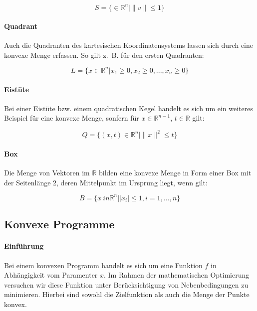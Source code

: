 \begin{equation*}
S = \{ \in \mathbb{R}^{n} | \|v\| \le 1\}
\end{equation*}

\paragraph{Quadrant}

Auch die Quadranten des kartesischen Koordinatensystems lassen sich durch eine konvexe Menge erfassen. So gilt z.~B. für den ersten Quadranten:

\begin{equation*}
L = \{ x \in \mathbb{R}^{n} | x_1 \ge 0, x_2 \ge 0, ..., x_n \ge 0\}
\end{equation*}

\paragraph{Eistüte}

Bei einer Eistüte bzw. einem quadratischen Kegel handelt es sich um ein weiteres Beispiel für eine konvexe Menge, sonfern für $x \in \mathbb{R}^{n-1}$, $t \in \mathbb{R}$ gilt:

\begin{equation*}
Q = \{(x, t) \in \mathbb{R}^{n} | \|x\|^{2} \le t\}
\end{equation*}

\paragraph{Box}

Die Menge von Vektoren im $\mathbb{R}$ bilden eine konvexe Menge in Form einer Box mit der Seitenlänge 2, deren Mittelpunkt im Ursprung liegt, wenn gilt:

\begin{equation*}
B = \{x \ in \mathbb{R}^{n} | |x_{i}| \le 1, i = 1, ..., n\}
\end{equation*}

\subsection{Konvexe Programme}

\paragraph{Einführung}

Bei einem konvexen Programm handelt es sich um eine Funktion $f$ in Abhängigkeit vom Paramenter $x$. Im Rahmen der mathematischen Optimierung versuchen wir diese Funktion unter Berücksichtigung von Nebenbedingungen zu minimieren. Hierbei sind sowohl die Zielfunktion als auch die Menge der Punkte konvex.

